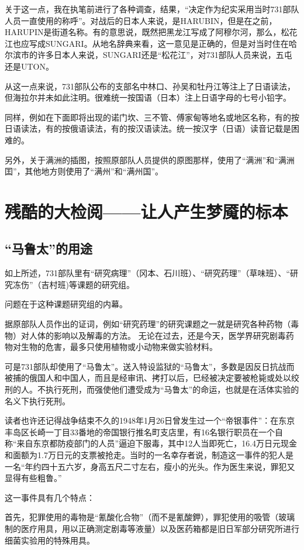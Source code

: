 \documentclass[a4paper,12pt,UTF8,twoside]{ctexbook}
\begin{document}
关于这一点，我在执笔前进行了各种调查，结果，“决定作为纪实采用当时731部队人员一直使用的称呼”。对战后的日本人来说，是HARUBIN，但是在之前，HARUPIN是街道名称。有的意思说，既然把黑龙江写成了阿穆尔河，那么，松花江也应写成SUNGARI。从地名辞典来看，这一意见是正确的，但是对当时住在哈尔滨市的许多日本人来说，SUNGARI还是“松花江”，对731部队人员来说，五屯还是UTON。

从这一点来说，731部队公布的支部名中林口、孙吴和牡丹江等注上了日语读法，但海拉尔并未如此注明。很难统一按国语（日本）注上日语字母的七号小铅字。

同样，例如在下面即将出现的诺门坎、三不管、傅家甸等地名或地区名称，有的按日语读法，有的按俄语读法，有的按汉语读法。统一按汉字（日语）读音记载是困难的。

另外，关于满洲的插图，按照原部队人员提供的原图那样，使用了“满洲”和“满洲囯”，其他地方则使用了“满州”和“满州国”。

\chapter{残酷的大检阅——让人产生梦魇的标本}

\section{“马鲁太”的用途}

如上所述，731部队里有“研究病理”（冈本、石川班）、“研究药理”（草味班）、“研究冻伤”（吉村班)等课题的研究组。

问题在于这种课题研究组的内幕。

据原部队人员作出的证词，例如“研究药理”的研究课题之一就是研究各种药物（毒物）对人体的影响以及解毒的方法。
无论在过去，还是今天，医学界研究剧毒药物对生物的危害，最多只使用植物或小动物来做实验材料。

可是731部队却使用了“马鲁太”。送入特设监狱的“马鲁太”，多数是因反日抗战而被捕的俄国人和中国人，而且是经审讯、拷打以后，巳经被决定要被枪毙或处以绞刑的人。不执行死刑，而强使他们遭受成为“马鲁太”的命运，也就是在活体实验的名义下执行死刑。

读者也许还记得战争结束不久的1948年1月26日曾发生过一个“帝银事件”：在东京丰岛区长崎一丁目33番地的帝国银行推名町支店里，有16名银行职员在一个自称“来自东京都防疫部门的人员”逼迫下服毒，其中12人当即死亡，16.4万日元现金和面额为1.7万日元的支票被抢走。当时的一名幸存者说，制造这一事件的犯人是一名“年约四十五六岁，身高五尺二寸左右，瘦小的光头。作为医生来说，罪犯又显得有些粗鲁。”

这一事件具有几个特点：

首先，犯罪使用的毒物是“氰酸化合物”（而不是氰酸鉀），罪犯使用的吸管（玻璃制的医疗用具，用以正确测定剧毒等液量）以及医药箱都是旧日军部分研究所进行细菌实验用的特殊用具。
\end{document}
